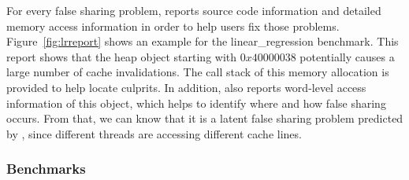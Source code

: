 For every false sharing problem, \Predator{} reports source code information and detailed memory access information in order to help users fix those problems. Figure~\ref{fig:lrreport} shows an example for the linear\_regression benchmark. This report shows that the heap object starting with $0x40000038$ potentially causes a large number of cache invalidations. The call stack of this memory allocation is provided to help locate culprits. In addition, \Predator{} also reports word-level access information of this object, which helps to identify where and how false sharing occurs. From that, we can know that it is a latent false sharing problem predicted by \Predator{}, since different threads are accessing different cache lines. 

\subsubsection{Benchmarks}
\label{sec:benchmarks}

\begin{table}[!t]
{\centering
{}
\caption{False sharing problems in the Phoenix and PARSEC benchmark suites. \label{table:detection}}
}
\end{table}

